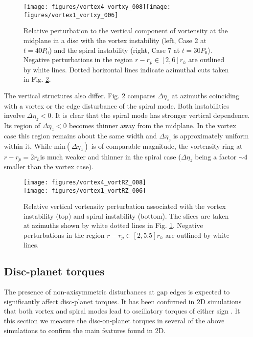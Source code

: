 \begin{figure}
  \centering
  \texttt{[image: figures/vortex4\_vortxy\_008]}\texttt{[image: figures/vortex1\_vortxy\_006]}
  \caption{Relative perturbation to the vertical component of
    vortensity at the midplane in a disc with the vortex instability
    (left, Case 2 at $t=40P_0$) and the 
    spiral instability (right, Case 7 at $t=30P_0$). Negative
    perturbations in the region $r-r_p\in[2,6]r_h$ are outlined by white lines. 
    Dotted horizontal lines indicate azimuthal cuts taken in
    Fig. \ref{vortex4_vortex1_vortRZ}.   
    \label{vortex4_vortex1_vortxy}}
\end{figure}


The vertical structures also differ. Fig. \ref{vortex4_vortex1_vortRZ}
compares $\Delta\eta_z$ at azimuths coinciding with 
a vortex or the edge disturbance of the spiral mode. Both
instabilities involve $\Delta\eta_z<0$. It is clear that 
the spiral mode has stronger vertical dependence. Its 
region of $\Delta\eta_z<0$ becomes thinner away from
the midplane. In the vortex case this region remains 
about the same width and  $\Delta\eta_z$ is approximately uniform
within it. 
While $\mathrm{min}(\Delta\eta_z)$ is of comparable
magnitude, the vortensity ring at $r-r_p=2r_h$is much weaker and
thinner in the spiral case ($\Delta\eta_z$ being a factor $\sim 4$
smaller than the vortex case).   
 

\begin{figure}
  \centering
  \texttt{[image: figures/vortex4\_vortRZ\_008]}\\\texttt{[image: figures/vortex1\_vortRZ\_006]}
  \caption{Relative vertical vortensity perturbation
    associated with the vortex instability (top) and spiral
    instability (bottom). The slices are taken at azimuths shown by
    white dotted lines in Fig. \ref{vortex4_vortex1_vortxy}. Negative
    perturbations in the region $r-r_p\in[2,5.5]r_h$ are outlined by
    white lines. \label{vortex4_vortex1_vortRZ}} 
\end{figure}

\subsection{Disc-planet torques}
The presence of non-axisymmetric disturbances at gap edges is
expected to significantly affect disc-planet torques. It has been 
confirmed in 2D simulations that both vortex and spiral modes lead to
oscillatory torques of either sign \citep{li05,lin11b}. 
It this section we measure the disc-on-planet torques in several of the above simulations
to confirm the main features found in 2D. 

